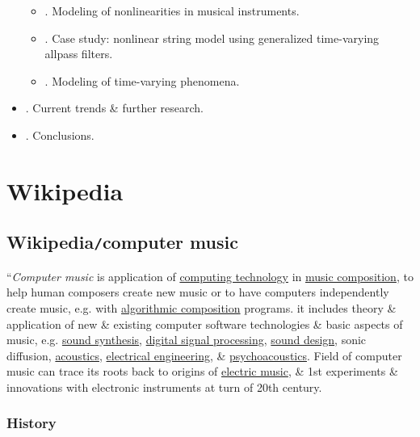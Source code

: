 \documentclass{article}
\begin{document}
\begin{itemize}
	\begin{itemize}
		\item {. Modeling of nonlinearities in musical instruments.}
		\item {. Case study: nonlinear string model using generalized time-varying allpass filters.}
		\item {. Modeling of time-varying phenomena.}
	\end{itemize}
	\item {. Current trends \& further research.}
	\item {. Conclusions.}
\end{itemize}


\section{Wikipedia}

\subsection{Wikipedia{\tt/}computer music}
``{\it Computer music} is application of \href{https://en.wikipedia.org/wiki/Computing_technology}{computing technology} in \href{https://en.wikipedia.org/wiki/Musical_composition}{music composition}, to help human composers create new music or to have computers independently create music, e.g. with \href{https://en.wikipedia.org/wiki/Algorithmic_composition}{algorithmic composition} programs. it includes theory \& application of new \& existing computer software technologies \& basic aspects of music, e.g. \href{https://en.wikipedia.org/wiki/Sound_synthesis}{sound synthesis}, \href{https://en.wikipedia.org/wiki/Digital_signal_processing}{digital signal processing}, \href{https://en.wikipedia.org/wiki/Sound_design}{sound design}, sonic diffusion, \href{https://en.wikipedia.org/wiki/Acoustics}{acoustics}, \href{https://en.wikipedia.org/wiki/Electrical_engineering}{electrical engineering}, \& \href{https://en.wikipedia.org/wiki/Psychoacoustics}{psychoacoustics}. Field of computer music can trace its roots back to origins of \href{https://en.wikipedia.org/wiki/Electronic_music}{electric music}, \& 1st experiments \& innovations with electronic instruments at turn of 20th century.

\subsubsection{History}
\end{document}
